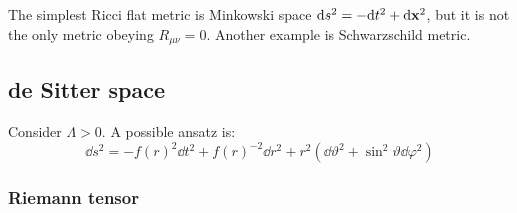 
The simplest Ricci flat metric is Minkowski space $ \mathrm{d} s^2 = -\mathrm{d} t^2 + \mathrm{d} \mathbf{x}^2 $, but it is not the only metric obeying $ R_{\mu \nu} = 0 $. Another example is Schwarzschild metric.

\subsection{de Sitter space}
\label{ssec:dS-space}

Consider $ \Lambda > 0 $. A possible ansatz is:
\begin{equation*}
  \dd s^2 = - f(r)^2 \dd t^2 + f(r)^{-2} \dd r^2 + r^2 (\dd \vartheta^2 + \sin^2 \vartheta \dd \varphi^2)
\end{equation*}

\subsubsection{Riemann tensor}

